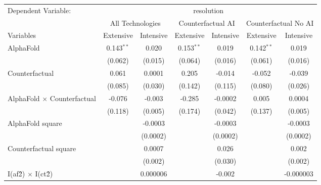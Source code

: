 \begingroup
\centering
\begin{tabular}{lcccccc}
   \tabularnewline \midrule \midrule
   Dependent Variable: & \multicolumn{6}{c}{resolution}\\
 & \multicolumn{2}{c}{All Technologies} & \multicolumn{2}{c}{Counterfactual AI} & \multicolumn{2}{c}{Counterfactual No AI} \\
\cmidrule(lr){1-1}\cmidrule(lr){2-3} \cmidrule(lr){4-5} \cmidrule(lr){6-7}
Variables & \multicolumn{1}{c}{Extensive} & \multicolumn{1}{c}{Intensive} & \multicolumn{1}{c}{Extensive} & \multicolumn{1}{c}{Intensive} & \multicolumn{1}{c}{Extensive} & \multicolumn{1}{c}{Intensive} \\
\cmidrule(lr){1-1}\cmidrule(lr){2-2} \cmidrule(lr){3-3} \cmidrule(lr){4-4} \cmidrule(lr){5-5} \cmidrule(lr){6-6} \cmidrule(lr){7-7}
   AlphaFold                          & 0.143$^{**}$ & 0.020      & 0.153$^{**}$ & 0.019    & 0.142$^{**}$ & 0.019\\   
                                      & (0.062)      & (0.015)    & (0.064)      & (0.016)  & (0.061)      & (0.016)\\   
   Counterfactual                     & 0.061        & 0.0001     & 0.205        & -0.014   & -0.052       & -0.039\\   
                                      & (0.085)      & (0.030)    & (0.142)      & (0.115)  & (0.080)      & (0.026)\\   
   AlphaFold $\times$ Counterfactual  & -0.076       & -0.003     & -0.285       & -0.0002  & 0.005        & 0.0004\\   
                                      & (0.118)      & (0.005)    & (0.174)      & (0.042)  & (0.137)      & (0.005)\\   
   AlphaFold square                   &              & -0.0003    &              & -0.0003  &              & -0.0003\\   
                                      &              & (0.0002)   &              & (0.0002) &              & (0.0002)\\   
   Counterfactual square              &              & 0.0007     &              & 0.026    &              & 0.002\\   
                                      &              & (0.002)    &              & (0.030)  &              & (0.002)\\   
   I(af\^2) $\times$ I(ct\^2)         &              & 0.000006   &              & -0.002   &              & -0.000003\\   

\end{tabular}
